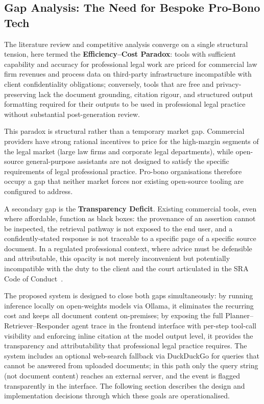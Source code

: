 \documentclass[11pt,a4paper]{article}
\begin{document}
\subsection{Gap Analysis: The Need for Bespoke Pro-Bono Tech}

The literature review and competitive analysis converge on a single structural tension, here
termed the \textbf{Efficiency--Cost Paradox}: tools with sufficient capability and accuracy
for professional legal work are priced for commercial law firm revenues and process data on
third-party infrastructure incompatible with client confidentiality obligations; conversely,
tools that are free and privacy-preserving lack the document grounding, citation rigour, and
structured output formatting required for their outputs to be used in professional legal
practice without substantial post-generation review.

This paradox is structural rather than a temporary market gap. Commercial providers have
strong rational incentives to price for the high-margin segments of the legal market (large
law firms and corporate legal departments), while open-source general-purpose assistants are
not designed to satisfy the specific requirements of legal professional practice. Pro-bono
organisations therefore occupy a gap that neither market forces nor existing open-source
tooling are configured to address.

A secondary gap is the \textbf{Transparency Deficit}. Existing commercial tools, even where
affordable, function as black boxes: the provenance of an assertion cannot be inspected, the
retrieval pathway is not exposed to the end user, and a confidently-stated response is not
traceable to a specific page of a specific source document. In a regulated professional
context, where advice must be defensible and attributable, this opacity is not merely
inconvenient but potentially incompatible with the duty to the client and the court
articulated in the SRA Code of Conduct~\cite{sra2023}.

The proposed system is designed to close both gaps simultaneously: by running inference
locally on open-weights models via Ollama, it eliminates the recurring cost and keeps all
document content on-premises; by exposing the full Planner--Retriever--Responder agent trace in
the frontend interface with per-step tool-call visibility and enforcing inline citation at the
model output level, it provides the transparency and attributability that professional legal
practice requires.  The system includes an optional web-search fallback via DuckDuckGo for
queries that cannot be answered from uploaded documents; in this path only the query string
(not document content) reaches an external server, and the event is flagged transparently in
the interface.  The following section describes the design and implementation decisions
through which these goals are operationalised.
\end{document}
